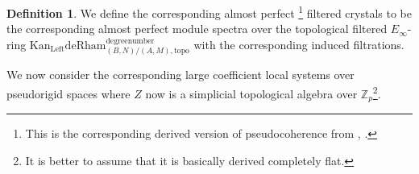 \documentclass[11pt]{book}
\theoremstyle{definition}
\newtheorem{definition}[theorem]{Definition}
\numberwithin{equation}{section}
\begin{document}
\begin{definition}
We define the corresponding almost perfect \footnote{This is the corresponding derived version of pseudocoherence from \cite{12Lu1}, \cite{12Lu2}.} filtered crystals to be the corresponding almost perfect module spectra over the topological filtered $E_\infty$-ring $\mathrm{Kan}_\mathrm{Left}\mathrm{deRham}^\text{degreenumber}_{(B,N)/(A,M),\mathrm{topo}}$ with the corresponding induced filtrations.	
\end{definition}


\indent We now consider the corresponding large coefficient local systems over pseudorigid spaces where $Z$ now is a simplicial topological algebra over $\mathbb{Z}_p$\footnote{It is better to assume that it is basically derived completely flat.}.

\end{document}
